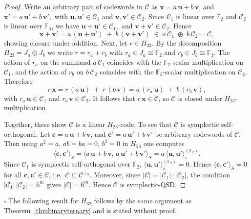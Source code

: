 \documentclass[11pt,a4paper]{article}
\def\qed{\hfill {$\square$}\goodbreak \medskip}
\theoremstyle{definition}
\numberwithin{equation}{section}
\newcommand{\F}{\mathbb{F}}
\def\C{{\mathcal{C}}}
\begin{document}
\begin{proof}
Write an arbitrary pair of codewords in \(\C\) as $\mathbf{x}
= a\,\mathbf{u} + b\,\mathbf{v}$, and $\mathbf{x}' = a\,\mathbf{u}' + b\,\mathbf{v}',$
with \(\mathbf{u},\mathbf{u}'\in\C_1\) and \(\mathbf{v},\mathbf{v}'\in\C_2\).  Since \(\C_1\) is linear over \(\mathbb{F}_2\) and \(\C_2\) is linear over \(\mathbb{F}_3\), we have $\mathbf{u} + \mathbf{u}' \in \C_1,$ and $\mathbf{v} + \mathbf{v}' \in \C_2$.
Hence
\[
\mathbf{x} + \mathbf{x}'
= a\,(\mathbf{u} + \mathbf{u}') \;+\; b\,(\mathbf{v} + \mathbf{v}')
\;\in\;
a\,\C_1 \;\oplus\; b\,\C_2
= \C,
\]
showing closure under addition. Next, let \(r\in H_{23}\).  By the decomposition \(H_{23}=J_a\oplus J_b\) we write \(r=r_a+r_b\) with \(r_a\in J_a\cong\mathbb{F}_2\) and \(r_b\in J_b\cong\mathbb{F}_3\).  The action of \(r_a\) on the summand \(a\,\C_1\) coincides with the \(\mathbb{F}_2\)-scalar multiplication on \(\C_1\), and the action of \(r_b\) on \(b\,\C_2\) coincides with the \(\mathbb{F}_3\)-scalar multiplication on \(\C_2\).  Therefore
\[
r\,\mathbf{x}
= r\,(a\,\mathbf{u}) \;+\; r\,(b\,\mathbf{v})
= a\,(r_a\,\mathbf{u}) \;+\; b\,(r_b\,\mathbf{v}),
\]
with \(r_a\,\mathbf{u}\in\C_1\) and \(r_b\,\mathbf{v}\in\C_2\).  It follows that \(r\,\mathbf{x}\in\C\), so \(\C\) is closed under \(H_{23}\)-multiplication.

Together, these show \(\C\) is  a linear \(H_{23}\)-code. To see that \(\C\) is symplectic self-orthogonal, Let $\mathbf{c}=a\,\mathbf{u}+b\,\mathbf{v}$, and $\mathbf{c}'=a\,\mathbf{u}'+b\,\mathbf{v}'$
be arbitrary codewords of \(\C\).  Then using \(a^2=a\), \(ab=ba=0\), \(b^2=0\) in \(H_{23}\) one computes
\[
\bigl\langle \mathbf{c},\mathbf{c}'\bigr\rangle_S
=\bigl\langle a\,\mathbf{u}+b\,\mathbf{v},\,a\,\mathbf{u}'+b\,\mathbf{v}'\bigr\rangle_S
= a\,\bigl\langle \mathbf{u},\mathbf{u}'\bigr\rangle_s^{(\F_2)}.
\]
Since \(\C_1\) is symplectic self-orthogonal over \(\F_2\), \(\langle \mathbf{u},\mathbf{u}'\rangle_s^{(\F_2)}=0\).  Hence \(\langle \mathbf{c},\mathbf{c}'\rangle_S=0\) for all \(\mathbf{c},\mathbf{c}'\in\C\), i.e.\ \(\C\subseteq\C^{\perp_S}\).
Moreover, since \(\lvert\C\rvert=\lvert\C_1\rvert\cdot\lvert\C_2\rvert\), the condition
\(\lvert\C_1\rvert\,\lvert\C_2\rvert=6^m\) gives \(\lvert\C\rvert=6^m\).   Hence \(\C\) is symplectic-QSD.
\end{proof}
\qed
The following result for \(H_{32}\) follows by the same  argument as Theorem~\ref{thmbinaryternary} and is stated without proof.
\end{document}
